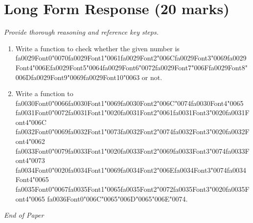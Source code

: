 \documentclass[12pt]{article}
\begin{document}
\section*{Long Form Response (20 marks)}
\textit{Provide thorough reasoning and reference key steps.}
\begin{enumerate}[label=\arabic*.]
\item Write a function to check whether the given number is {\csname fa0029Font0\endcsname\char"0070}{\csname fa0029Font1\endcsname\char"0061}{\csname fa0029Font2\endcsname\char"006C}{\csname fa0029Font3\endcsname\char"0069}{\csname fa0029Font4\endcsname\char"006E}{\csname fa0029Font5\endcsname\char"0064}{\csname fa0029Font6\endcsname\char"0072}{\csname fa0029Font7\endcsname\char"006F}{\csname fa0029Font8\endcsname\char"006D}{\csname fa0029Font9\endcsname\char"0069}{\csname fa0029Font10\endcsname\char"0063} or not.
\item Write a function to {\csname fa0030Font0\endcsname\char"0066}{\csname fa0030Font1\endcsname\char"0069}{\csname fa0030Font2\endcsname\char"006C}{\char"0074}{\csname fa0030Font4\endcsname\char"0065} {\csname fa0031Font0\endcsname\char"0072}{\csname fa0031Font1\endcsname\char"0020}{\csname fa0031Font2\endcsname\char"0061}{\csname fa0031Font3\endcsname\char"0020}{\csname fa0031Font4\endcsname\char"006C} {\csname fa0032Font0\endcsname\char"0069}{\csname fa0032Font1\endcsname\char"0073}{\csname fa0032Font2\endcsname\char"0074}{\csname fa0032Font3\endcsname\char"0020}{\csname fa0032Font4\endcsname\char"0062} {\csname fa0033Font0\endcsname\char"0079}{\csname fa0033Font1\endcsname\char"0020}{\csname fa0033Font2\endcsname\char"0069}{\csname fa0033Font3\endcsname\char"0074}{\csname fa0033Font4\endcsname\char"0073} {\csname fa0034Font0\endcsname\char"0020}{\csname fa0034Font1\endcsname\char"0069}{\csname fa0034Font2\endcsname\char"006E}{\csname fa0034Font3\endcsname\char"0074}{\csname fa0034Font4\endcsname\char"0065} {\csname fa0035Font0\endcsname\char"0067}{\csname fa0035Font1\endcsname\char"0065}{\csname fa0035Font2\endcsname\char"0072}{\csname fa0035Font3\endcsname\char"0020}{\csname fa0035Font4\endcsname\char"0065} {\csname fa0036Font0\endcsname\char"006C}{\char"0065}{\char"006D}{\char"0065}{\char"006E}{\char"0074}.
\end{enumerate}

\vfill
\noindent\textit{End of Paper}
\end{document}
